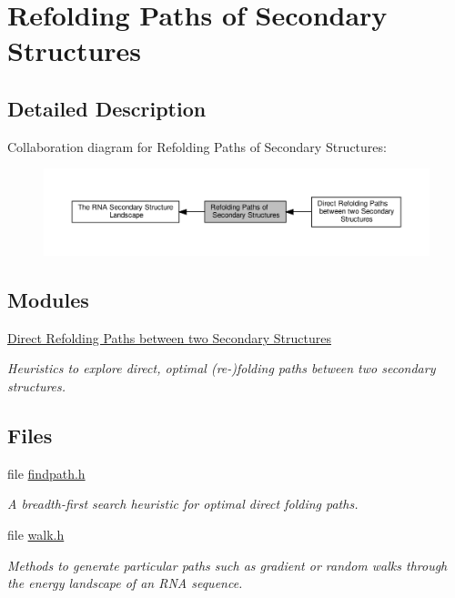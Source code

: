 \hypertarget{group__paths}{}\section{Refolding Paths of Secondary Structures}
\label{group__paths}


\subsection{Detailed Description}
Collaboration diagram for Refolding Paths of Secondary Structures\+:
\nopagebreak
\begin{figure}[H]
\begin{center}
\leavevmode
\includegraphics[width=350pt]{group__paths}
\end{center}
\end{figure}
\subsection*{Modules}
\begin{DoxyCompactItemize}
\item 
\hyperlink{group__direct__paths}{Direct Refolding Paths between two Secondary Structures}
\begin{DoxyCompactList}\small\item\em Heuristics to explore direct, optimal (re-\/)folding paths between two secondary structures. \end{DoxyCompactList}\end{DoxyCompactItemize}
\subsection*{Files}
\begin{DoxyCompactItemize}
\item 
file \hyperlink{findpath_8h}{findpath.\+h}
\begin{DoxyCompactList}\small\item\em A breadth-\/first search heuristic for optimal direct folding paths. \end{DoxyCompactList}\item 
file \hyperlink{walk_8h}{walk.\+h}
\begin{DoxyCompactList}\small\item\em Methods to generate particular paths such as gradient or random walks through the energy landscape of an R\+NA sequence. \end{DoxyCompactList}\end{DoxyCompactItemize}
